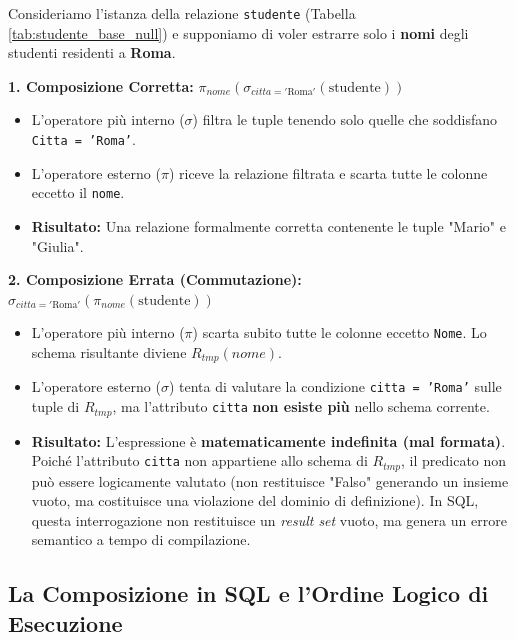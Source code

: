 \begin{example}
    Consideriamo l'istanza della relazione \texttt{studente} (Tabella \ref{tab:studente_base_null}) e supponiamo di voler estrarre solo i \textbf{nomi} degli studenti residenti a \textbf{Roma}.

    \textbf{1. Composizione Corretta:} $\pi_{nome}(\sigma_{citta = '\text{Roma}'}(\text{studente}))$
    \begin{itemize}
        \item L'operatore più interno ($\sigma$) filtra le tuple tenendo solo quelle che soddisfano \texttt{Citta = 'Roma'}.
        \item L'operatore esterno ($\pi$) riceve la relazione filtrata e scarta tutte le colonne eccetto il \texttt{nome}.
        \item \textbf{Risultato:} Una relazione formalmente corretta contenente le tuple "Mario" e "Giulia".
    \end{itemize}

    \textbf{2. Composizione Errata (Commutazione):} $\sigma_{citta = '\text{Roma}'}(\pi_{nome}(\text{studente}))$
    \begin{itemize}
        \item L'operatore più interno ($\pi$) scarta subito tutte le colonne eccetto \texttt{Nome}. Lo schema risultante diviene $R_{tmp}(nome)$.
        \item L'operatore esterno ($\sigma$) tenta di valutare la condizione \texttt{citta = 'Roma'} sulle tuple di $R_{tmp}$, ma l'attributo \texttt{citta} \textbf{non esiste più} nello schema corrente.
        \item \textbf{Risultato:} L'espressione è \textbf{matematicamente indefinita (mal formata)}. Poiché l'attributo \texttt{citta} non appartiene allo schema di $R_{tmp}$, il predicato non può essere logicamente valutato (non restituisce "Falso" generando un insieme vuoto, ma costituisce una violazione del dominio di definizione). In SQL, questa interrogazione non restituisce un \textit{result set} vuoto, ma genera un errore semantico a tempo di compilazione.
    \end{itemize}
\end{example}

\subsection{La Composizione in SQL e l'Ordine Logico di Esecuzione}

